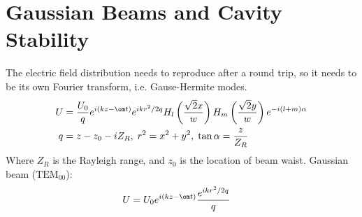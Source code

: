 \documentclass[a4paper, 11pt, normalem]{report}
\begin{document}
\chapter{Gaussian Beams and Cavity Stability}
The electric field distribution needs to reproduce after a round trip, so it needs to be its own Fourier transform, i.e. Gause-Hermite modes.
\begin{align}
    U &= \frac{U_0}{q}e^{i(kz-\om t)}e^{ikr^2/2q}H_l\left(\frac{\sqrt{2}x}{w}\right)H_m\left(\frac{\sqrt{2}y}{w}\right)e^{-i(l+m)\alpha} \\
    q &= z-z_0-iZ_R,\; r^2 = x^2+y^2,\; \tan\alpha = \frac{z}{Z_R}
\end{align}
Where $Z_R$ is the Rayleigh range, and $z_0$ is the location of beam waist.
Gaussian beam ($\text{TEM}_{00}$):
\begin{align}
    U &= U_0e^{i(kz-\om t)}\frac{e^{ikr^2/2q}}{q}
\end{align}
\end{document}
